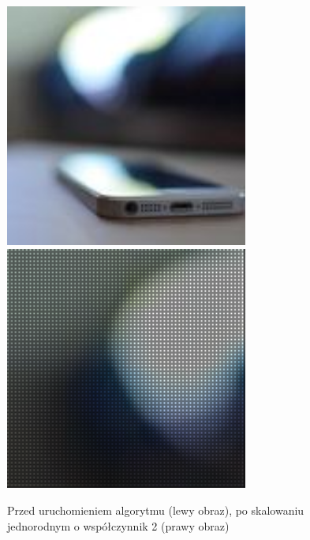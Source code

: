 \documentclass[a4paper,12pt]{book}
\begin{document}
\begin{figure}[H]
	\caption{Przed uruchomieniem algorytmu (lewy obraz), po skalowaniu jednorodnym o współczynnik 2 (prawy obraz)}
	\includegraphics[width=8cm, height=8cm]{phone-unmodified.jpg}
	\includegraphics[width=8cm, height=8cm]{4-2/homogeneous-scaling-phone.png}
\end{figure}
\end{document}
